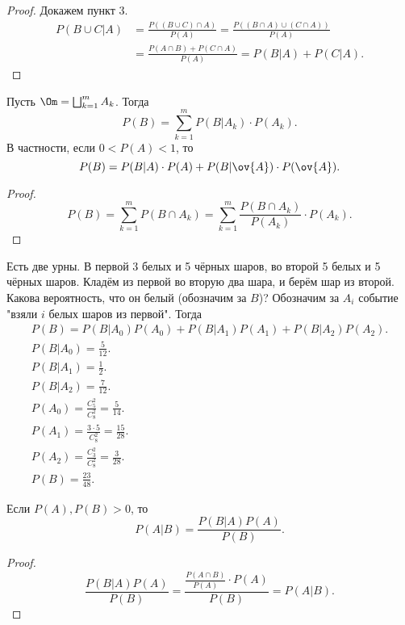  \begin{proof} Докажем пункт 3.
 \begin{align*}
     P(B\cup C| A) &= \frac{P((B \cup C)\cap A)}{P(A)} = \frac{P((B \cap A)\cup(C \cap A))}{P(A)} \\&= \frac{P(A\cap B)+P(C\cap A)}{P(A)} = P(B|A) + P(C|A).
 \end{align*}
     
 \end{proof}

 \begin{theorem}
Пусть $\Om = \bigsqcup_{k=1}^m{A_k}$. Тогда
     $$P(B) = \sum_{k=1}^m P(B|A_k)\cdot P(A_k).$$
     В частности, если $0 < P(A) < 1$, то
     $$P(B) = P(B|A) \cdot P(A)+P(B|\ov{A}) \cdot P(\ov{A}).$$
 \end{theorem}

 \begin{proof}
     $$P(B) = \sum_{k=1}^m P(B \cap A_k) = \sum_{k=1}^m \frac{P(B\cap A_k)}{P(A_k)}\cdot P(A_k).$$

 \end{proof}

 \begin{example} Есть две урны. В первой 3 белых и 5 чёрных шаров, во второй 5 белых и 5 чёрных шаров. Кладём из первой во вторую два шара, и берём шар из второй. Какова вероятность, что он белый (обозначим за $B$)?
Обозначим за $A_i$ событие "взяли $i$ белых шаров из первой". Тогда
\begin{gather*}
    P(B) = P(B|A_0)P(A_0) + P(B|A_1)P(A_1)+P(B|A_2)P(A_2).\\
    P(B|A_0) = \frac{5}{12}.\\
    P(B|A_1) = \frac{1}{2}.\\
    P(B|A_2) = \frac{7}{12}.\\
    P(A_0) = \frac{C_5^2}{C_8^2} = \frac{5}{14}.\\
    P(A_1) = \frac{3\cdot 5}{C_8^2} = \frac{15}{28}.\\
    P(A_2) = \frac{C_3^2}{C_8^2} = \frac{3}{28}.\\
    P(B) = \frac{23}{48}.
\end{gather*}
 \end{example}

 \begin{theorem}
Если $P(A), P(B) > 0$, то
     $$P(A|B) = \frac{P(B|A)P(A)}{P(B)}.$$
 \end{theorem}

 \begin{proof}
     $$\frac{P(B|A)P(A)}{P(B)} = \frac{\frac{P(A\cap B)}{P(A)}\cdot P(A)}{P(B)} = P(A|B).$$
 \end{proof}

